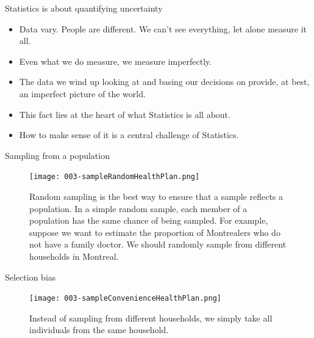 \documentclass[10pt]{beamer}\usepackage[]{graphicx}\usepackage[]{color}
\begin{document}
\begin{frame}{Statistics is about quantifying uncertainty}


\begin{itemize}
	\item Data vary. People are different. We can't see everything, let alone measure
	it all. 
	\item Even what we do measure, we measure imperfectly. 
	\item The data we wind up looking at and basing our decisions on provide, at best, an imperfect
	picture of the world.
	 \item This fact lies at the heart of what Statistics is all about.	
	 \item How to make sense of it is a central challenge of Statistics.
\end{itemize}
	
\end{frame}




\begin{frame}{Sampling from a population}

\begin{figure}
\centering
\texttt{[image: 003-sampleRandomHealthPlan.png]}
\caption{Random sampling is the best way to ensure that a sample reflects a population. In a simple random sample, each member of a population has the same chance of being sampled. For example, suppose we want to estimate the proportion of Montrealers who do not have a family doctor. We should randomly sample from different households in Montreal.}
\end{figure}
\end{frame}




\begin{frame}{Selection bias}
	
	\begin{figure}
		\centering
		\texttt{[image: 003-sampleConvenienceHealthPlan.png]}
		\caption{Instead of sampling from different households, we simply take all individuals from the same household.}
	\end{figure}
\end{frame}
\end{document}
